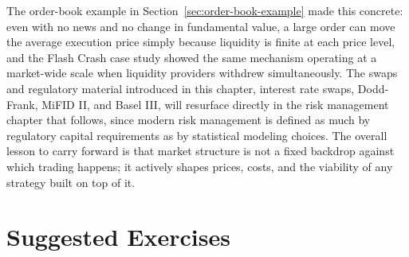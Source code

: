 \documentclass[../ai_in_finance]{subfiles}
\begin{document}
The order-book example in Section~\ref{sec:order-book-example} made this concrete: even with no news and no change in fundamental value, a large order can move the average execution price simply because liquidity is finite at each price level, and the Flash Crash case study showed the same mechanism operating at a market-wide scale when liquidity providers withdrew simultaneously.
The swaps and regulatory material introduced in this chapter, interest rate swaps, Dodd-Frank, MiFID II, and Basel III, will resurface directly in the risk management chapter that follows, since modern risk management is defined as much by regulatory capital requirements as by statistical modeling choices.
The overall lesson to carry forward is that market structure is not a fixed backdrop against which trading happens; it actively shapes prices, costs, and the viability of any strategy built on top of it.

\section{Suggested Exercises}
\end{document}
